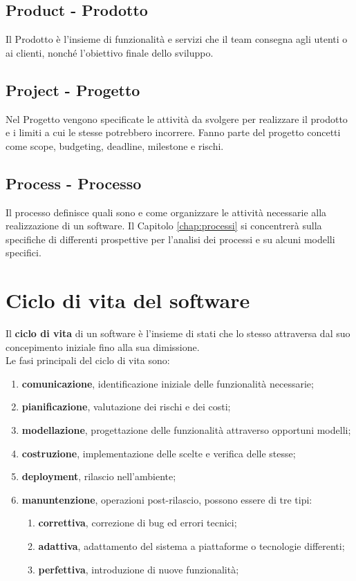 \subsection{Product - Prodotto}
Il Prodotto è l'insieme di funzionalità e servizi che il team consegna agli utenti o ai clienti, nonché l'obiettivo finale dello sviluppo. 
\subsection{Project - Progetto}
Nel Progetto vengono specificate le attività da svolgere per realizzare il prodotto e i limiti a cui le stesse potrebbero incorrere. Fanno parte del progetto concetti come scope, budgeting, deadline, milestone e rischi.
\subsection{Process - Processo}
Il processo definisce quali sono e come organizzare le attività necessarie alla realizzazione di un software. Il Capitolo \ref{chap:processi} si concentrerà sulla specifiche di differenti prospettive per l'analisi dei processi e su alcuni modelli specifici.
\section{Ciclo di vita del software}
Il \textbf{ciclo di vita} di un software è l'insieme di stati che lo stesso attraversa dal suo concepimento iniziale fino alla sua dimissione. \\
Le fasi principali del ciclo di vita sono:
\begin{enumerate}
    \item \textbf{comunicazione}, identificazione iniziale delle funzionalità necessarie;
    \item \textbf{pianificazione}, valutazione dei rischi e dei costi;
    \item \textbf{modellazione}, progettazione delle funzionalità attraverso opportuni modelli;
    \item \textbf{costruzione}, implementazione delle scelte e verifica delle stesse;
    \item \textbf{deployment}, rilascio nell'ambiente;
    \item \textbf{manuntenzione}, operazioni post-rilascio, possono essere di tre tipi:
    \begin{enumerate}
        \item \textbf{correttiva}, correzione di bug ed errori tecnici;
        \item \textbf{adattiva}, adattamento del sistema a piattaforme o tecnologie differenti;
        \item \textbf{perfettiva}, introduzione di nuove funzionalità;
    \end{enumerate}
\end{enumerate}